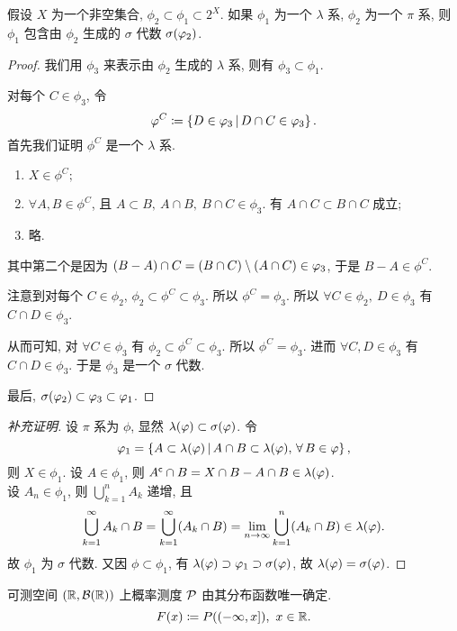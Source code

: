 \begin{theorem}
\label{dynkin1}
假设 $X$ 为一个非空集合, $\phi_2\subset\phi_1\subset 2^X$. 如果 $\phi_1$ 为一个 $\lambda$ 系, $\phi_2$ 为一个 $\pi$ 系, 则 $\phi_1$ 包含由 $\phi_2$ 生成的 $\sigma$ 代数 $\sigma\xk{\phi_2}$.
\end{theorem}
\begin{proof}
我们用 $\phi_3$ 来表示由 $\phi_2$ 生成的 $\lambda$ 系, 则有 $\phi_3\subset\phi_1$.\par
对每个 $C\in\phi_3$, 令
\[\varphi^C\coloneqq\left\{D\in\varphi_3\,\middle\vert\,D\cap C\in\varphi_3\right\}.\]
首先我们证明 $\phi^C$ 是一个 $\lambda$ 系.
\begin{enumerate}[\rm(1)]
\item $X\in\phi^C;$
\item $\forall A,B\in\phi^C$, 且 $A\subset B,\ A\cap B,\ B\cap C\in\phi_3$. 有 $A\cap C\subset B\cap C$ 成立;
\item 略.
\end{enumerate}
其中第二个是因为 $\left(B-A\right)\cap C=\left(B\cap C\right)\setminus\left(A\cap C\right)\in\varphi_3$, 于是 $B-A\in\phi^C$.\par
注意到对每个 $C\in\phi_2$, $\phi_2\subset \phi^C\subset \phi_3$. 所以 $\phi^C=\phi_3$. 所以 $\forall C\in\phi_2,\ D\in\phi_3$ 有 $C\cap D\in\phi_3$.\par 
从而可知, 对 $\forall C\in\phi_3$ 有 $\phi_2\subset \phi^C \subset \phi_3$. 所以 $\phi^C=\phi_3$. 进而 $\forall C,D\in\phi_3$ 有 $C\cap D\in\phi_3$. 于是 $\phi_3$ 是一个 $\sigma$ 代数.\par 
最后, $\sigma\xk{\phi_2}\subset \phi_3\subset\phi_1$.
\end{proof}
\begin{proof}[补充证明]
设 $\pi$ 系为 $\phi$, 显然 $\lambda\xk{\phi}\subset\sigma\xk{\phi}$. 令
\[\phi_1=\jh{A\subset\lambda\xk{\phi}}{A\cap B\subset\lambda\xk{\phi},\,\forall B\in\phi},\]
则 $X\in\phi_1$. 设 $A\in\phi_1$, 则 $A\bu\cap B=X\cap B-A\cap B\in\lambda\xk{\phi}$.\\
设 $A_n\in\phi_1$, 则 $\bigcup_{k=1}^{n}A_k$ 递增, 且
\[\bigcup_{k=1}^{\infty}A_k\cap B=\bigcup_{k=1}^{\infty}\xk{A_k\cap B}=\lim _{n\toi}\bigcup_{k=1}^{n}\xk{A_k\cap B}\in\lambda\xk{\phi}.\]
故 $\phi_1$ 为 $\sigma$ 代数. 又因 $\phi\subset\phi_1$, 有 $\lambda\xk{\phi}\supset\phi_1\supset\sigma\xk{\phi}$, 故 $\lambda\xk{\phi}=\sigma\xk{\phi}$.
\end{proof}
\begin{corollary}
可测空间 $\xk{\rr,\mathcal{B}\xk{\rr}}$ 上概率测度 $\mathcal{P}$ 由其分布函数唯一确定.
\[F(x)\dy P\xk{(-\infty,x]},\ x\in\rr.\]
\end{corollary}
